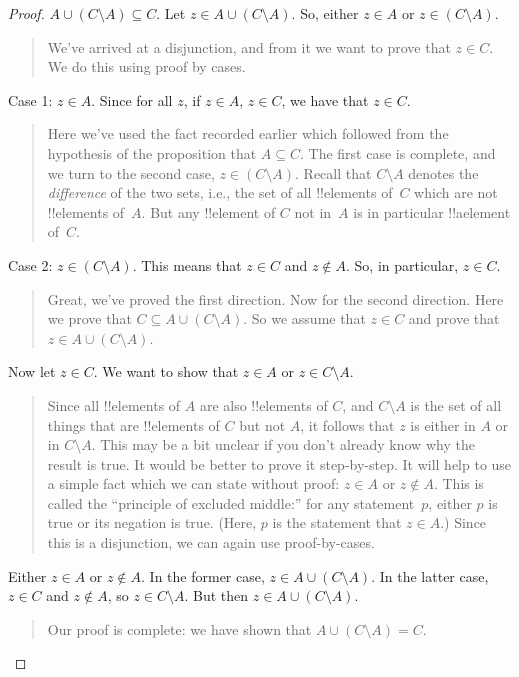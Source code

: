 \documentclass[../../../include/open-logic-section]{subfiles}
\begin{document}
\begin{proof}
  $A \cup (C \setminus A) \subseteq C$.  Let $z \in A \cup (C
  \setminus A)$. So, either $z \in A$ or $z \in (C \setminus A)$.
  \begin{quote}
    We've arrived at a disjunction, and from it we want to prove that
    $z \in C$. We do this using proof by cases.
  \end{quote}
  Case 1: $z \in A$. Since for all $z$, if $z \in A$, $z \in C$, we
  have that $z \in C$.
  \begin{quote}
    Here we've used the fact recorded earlier which followed from the
    hypothesis of the proposition that $A \subseteq C$.  The first
    case is complete, and we turn to the second case, $z \in (C
    \setminus A)$.  Recall that $C \setminus A$ denotes the
    \emph{difference} of the two sets, i.e., the set of all
    !!{element}s of~$C$ which are not !!{element}s of~$A$.  But any
    !!{element} of $C$ not in~$A$ is in particular !!a{element} of~$C$.
  \end{quote}
  Case 2: $z \in (C \setminus A)$.  This means that $z \in C$ and $z
  \notin A$. So, in particular, $z \in C$.
  \begin{quote}
    Great, we've proved the first direction. Now for the second
    direction. Here we prove that $C \subseteq A \cup (C \setminus
    A)$.  So we assume that $z \in C$ and prove that $z \in A \cup (C
    \setminus A)$.
  \end{quote}
  Now let $z \in C$. We want to show that $z \in A$ or $z \in C
  \setminus A$.
  \begin{quote}
    Since all !!{element}s of $A$ are also !!{element}s of $C$, and $C
    \setminus A$ is the set of all things that are !!{element}s of $C$
    but not $A$, it follows that $z$ is either in $A$ or in $C
    \setminus A$.  This may be a bit unclear if you don't already know
    why the result is true.  It would be better to prove it
    step-by-step.  It will help to use a simple fact which we can
    state without proof: $z \in A$ or $z \notin A$. This is called the
    ``principle of excluded middle:'' for any statement~$p$, either
    $p$ is true or its negation is true. (Here, $p$ is the statement
    that $z \in A$.)  Since this is a disjunction, we can again use
    proof-by-cases.
  \end{quote}
  Either $z \in A$ or $z \notin A$. In the former case, $z \in A \cup
  (C \setminus A)$. In the latter case, $z \in C$ and $z \notin A$, so
  $z \in C \setminus A$.  But then $z \in A \cup (C \setminus A)$.
  \begin{quote}
    Our proof is complete: we have shown that $A \cup (C \setminus A) = C$.
  \end{quote}
\end{proof}
\end{document}
